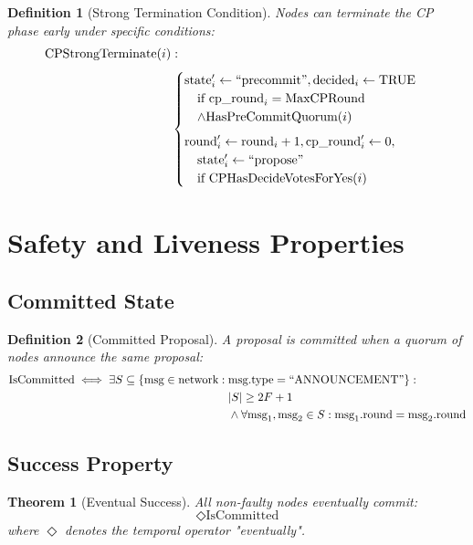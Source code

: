 \documentclass[11pt,a4paper,twoside]{article}
\newtheorem{definition}{Definition}[section]
\newtheorem{theorem}{Theorem}[section]
\begin{document}
\begin{definition}[Strong Termination Condition]
Nodes can terminate the CP phase early under specific conditions:
\begin{align}
\text{CPStrongTerminate}(i) &: \notag \\[0.3em]
&\begin{cases}
\text{state}'_i \gets \text{``precommit''}, \text{decided}_i \gets \text{TRUE} & \\
\quad \text{if } \text{cp\_round}_i = \text{MaxCPRound} & \\
\quad \land \text{HasPreCommitQuorum}(i) \\[0.5em]
\text{round}'_i \gets \text{round}_i + 1, \text{cp\_round}'_i \gets 0, & \\
\quad \text{state}'_i \gets \text{``propose''} & \\
\quad \text{if CPHasDecideVotesForYes}(i)
\end{cases}
\end{align}
\end{definition}

\section{Safety and Liveness Properties}

\subsection{Committed State}

\begin{definition}[Committed Proposal]
A proposal is committed when a quorum of nodes announce the same proposal:
\begin{align}
\text{IsCommitted} \iff \exists S \subseteq \{\text{msg} \in \text{network} : {} & \text{msg.type} = \text{``ANNOUNCEMENT''}\} : \notag \\
& |S| \geq 2F + 1 \notag \\
& \land \forall \text{msg}_1, \text{msg}_2 \in S : \text{msg}_1.\text{round} = \text{msg}_2.\text{round}
\end{align}
\end{definition}

\subsection{Success Property}

\begin{theorem}[Eventual Success]
All non-faulty nodes eventually commit:
\begin{equation}
\Diamond \text{IsCommitted}
\end{equation}
where $\Diamond$ denotes the temporal operator "eventually".
\end{theorem}
\end{document}
